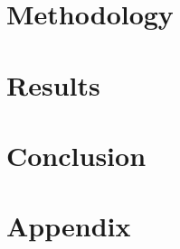 \documentclass[edeposit,fullpage]{uiucthesis2018}
\begin{document}
\chapter{Methodology}


\chapter{Results}


\chapter{Conclusion}


\chapter*{Appendix}


\backmatter
\nocite{*}


\end{document}
